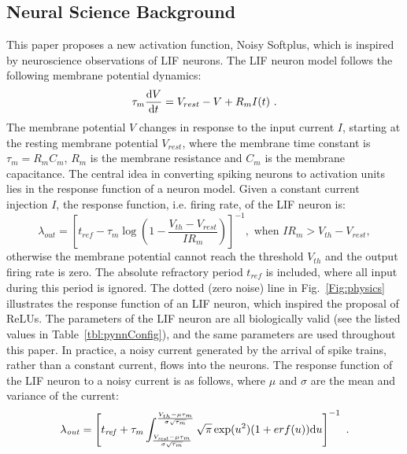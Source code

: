 	
	
	\subsection{Neural Science Background}
	This paper proposes a new activation function, Noisy Softplus, which is inspired by neuroscience observations of LIF neurons.
	The LIF neuron model follows the following membrane potential dynamics:
	\begin{equation}
	\tau_m \frac{\mathrm{d} V}{\mathrm{d} t}=V_{rest} - V + R_{m} I(t) ~.
	\label{eq:LIF}
	\end{equation}
	The membrane potential $V$ changes in response to the input current $I$, starting at the resting membrane potential $V_{rest}$, where the membrane time constant is $\tau_m = R_mC_m$, $R_m$ is the membrane resistance and $C_m$ is the membrane capacitance.
	The central idea in converting spiking neurons to activation units lies in the response function of a neuron model.
	Given a constant current injection $I$, the response function, i.e. firing rate, of the LIF neuron is:
	\begin{equation}
	\lambda_\mathit{out}=
	\left [ t_\mathit{ref}-\tau_m\log \left ( 1-\frac{V_{th}-V_\mathit{rest}}{IR_m}  \right )\right ]^{-1}, \textrm{~when~} IR_m>V_{th}-V_{rest},
	\label{equ:consI}
	\end{equation}
	otherwise the membrane potential cannot reach the threshold $V_{th}$ and the output firing rate is zero. 
	The absolute refractory period $t_\mathit{ref}$ is included, where all input during this period is ignored.
	The dotted (zero noise) line in Fig.~\ref{Fig:physics} illustrates the response function of an LIF neuron, which inspired the proposal of ReLUs.
	The parameters of the LIF neuron are all biologically valid (see the listed values in Table~\ref{tbl:pynnConfig}), and the same parameters are used throughout this paper.
	In practice, a noisy current generated by the arrival of spike trains, rather than a constant current, flows into the neurons.
	The response function
	of the LIF neuron to a noisy current is as follows, where $\mu$ and $\sigma$ are the mean and variance of the current:
	\begin{equation}
	\lambda_\mathit{out}=
	\left [ t_\mathit{ref}+\tau_m \int_{\frac{V_\mathit{rest}-\mu \tau_m }{\sigma \sqrt{\tau_m}}}^{\frac{V_{th}-\mu \tau_m }{\sigma \sqrt{\tau_m}}} \sqrt{\pi} \exp(u^{2}) (1+erf(u)) \mathrm{d} u \right ]^{-1} ~.
	\label{equ:noiseI}
	\end{equation}
	
